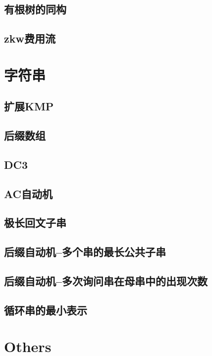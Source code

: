 \documentclass[a4paper,10pt]{book}
\begin{document}
	\section{有根树的同构}
		
	\section{zkw费用流}
		
\chapter{字符串}
	\section{扩展KMP}
		
	\section{后缀数组}
		
	\section{DC3}
		
	\section{AC自动机}
		
	\section{极长回文子串}
		
	\section{后缀自动机--多个串的最长公共子串}
		
	\section{后缀自动机--多次询问串在母串中的出现次数}
		
	\section{循环串的最小表示}
		
\chapter{Others}
\end{document}
